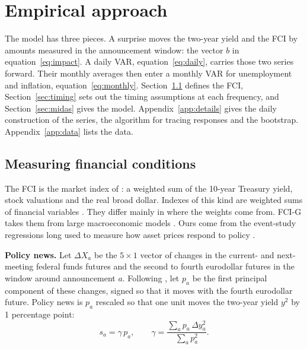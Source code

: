 \documentclass[11pt]{article}
\begin{document}
\section{Empirical approach}\label{sec:data}
The model has three pieces. A surprise moves the two-year yield and the FCI by amounts measured in the announcement window: the vector $b$ in equation~\eqref{eq:impact}. A daily VAR, equation~\eqref{eq:daily}, carries those two series forward. Their monthly averages then enter a monthly VAR for unemployment and inflation, equation~\eqref{eq:monthly}. Section~\ref{sec:measure} defines the FCI, Section~\ref{sec:timing} sets out the timing assumptions at each frequency, and Section~\ref{sec:midas} gives the model. Appendix~\ref{app:details} gives the daily construction of the series, the algorithm for tracing responses and the bootstrap. Appendix~\ref{app:data} lists the data.

\subsection{Measuring financial conditions}\label{sec:measure}
The FCI is the market index of \citet{fcinote}: a weighted sum of the 10-year Treasury yield, stock valuations and the real broad dollar. Indexes of this kind are weighted sums of financial variables \citep{hatzius2010}. They differ mainly in where the weights come from. FCI-G takes them from large macroeconomic models \citep{ajello2023}. Ours come from the event-study regressions long used to measure how asset prices respond to policy \citep{kuttner2001,bernanke2005,hanson2015,nakamura2018}.

\textbf{Policy news.} Let $\Delta X_a$ be the $5\times 1$ vector of changes in the current- and next-meeting federal funds futures and the second to fourth eurodollar futures in the window around announcement $a$. Following \citet{nakamura2018}, let $p_a$ be the first principal component of these changes, signed so that it moves with the fourth eurodollar future. Policy news is $p_a$ rescaled so that one unit moves the two-year yield $y^{2}$ by 1 percentage point:
\begin{equation}
s_a = \gamma\, p_a, \qquad \gamma = \frac{\sum_a p_a\, \Delta y^{2}_a}{\sum_a p_a^{2}}. \label{eq:ns}
\end{equation}
\end{document}
